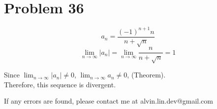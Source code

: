 \documentclass[letterpaper, 12pt]{article}
\begin{document}
\section*{Problem 36}
\[ a_{n} = \frac{(-1)^{n+1}n}{n+\sqrt{n}} \]
\[ \lim_{n\to\infty}{|a_{n}|} = \lim_{n\to\infty}{\frac{n}{n+\sqrt{n}}} = 1 \]
\begin{center}
  Since \( \lim_{n\to\infty}{|a_{n}|} \neq 0 \),
  \( \lim_{n\to\infty}{a_{n}} \neq 0 \), (Theorem). \\
  Therefore, this sequence is divergent.
\end{center}

\begin{center}
  If any errors are found, please contact me at alvin.lin.dev@gmail.com
\end{center}
\end{document}
